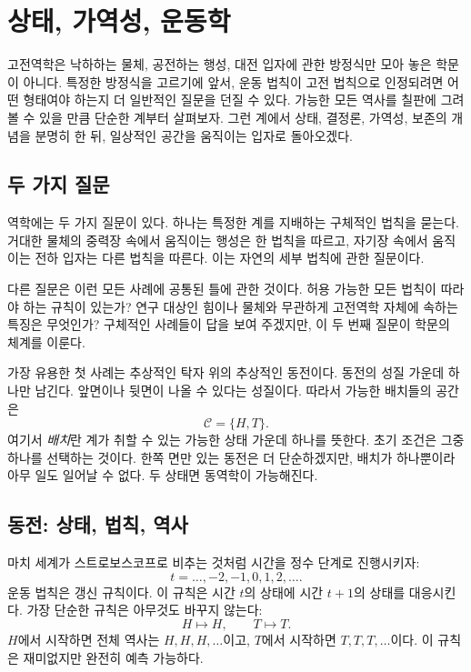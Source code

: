 \chapter{상태, 가역성, 운동학}

고전역학은 낙하하는 물체, 공전하는 행성, 대전 입자에 관한 방정식만 모아 놓은 학문이 아니다. 특정한 방정식을 고르기에 앞서, 운동 법칙이 고전 법칙으로 인정되려면 어떤 형태여야 하는지 더 일반적인 질문을 던질 수 있다. 가능한 모든 역사를 칠판에 그려 볼 수 있을 만큼 단순한 계부터 살펴보자. 그런 계에서 상태, 결정론, 가역성, 보존의 개념을 분명히 한 뒤, 일상적인 공간을 움직이는 입자로 돌아오겠다.

\section{두 가지 질문}

역학에는 두 가지 질문이 있다. 하나는 특정한 계를 지배하는 구체적인 법칙을 묻는다. 거대한 물체의 중력장 속에서 움직이는 행성은 한 법칙을 따르고, 자기장 속에서 움직이는 전하 입자는 다른 법칙을 따른다. 이는 자연의 세부 법칙에 관한 질문이다.

다른 질문은 이런 모든 사례에 공통된 틀에 관한 것이다. 허용 가능한 모든 법칙이 따라야 하는 규칙이 있는가? 연구 대상인 힘이나 물체와 무관하게 고전역학 자체에 속하는 특징은 무엇인가? 구체적인 사례들이 답을 보여 주겠지만, 이 두 번째 질문이 학문의 체계를 이룬다.

가장 유용한 첫 사례는 추상적인 탁자 위의 추상적인 동전이다. 동전의 성질 가운데 하나만 남긴다. 앞면이나 뒷면이 나올 수 있다는 성질이다. 따라서 가능한 배치들의 공간은
\begin{equation}
  \mathcal C=\{H,T\}.
\end{equation}
여기서 \emph{배치}란 계가 취할 수 있는 가능한 상태 가운데 하나를 뜻한다. 초기 조건은 그중 하나를 선택하는 것이다. 한쪽 면만 있는 동전은 더 단순하겠지만, 배치가 하나뿐이라 아무 일도 일어날 수 없다. 두 상태면 동역학이 가능해진다.

\section{동전: 상태, 법칙, 역사}

마치 세계가 스트로보스코프로 비추는 것처럼 시간을 정수 단계로 진행시키자:
\begin{equation}
  t=\ldots,-2,-1,0,1,2,\ldots .
\end{equation}
운동 법칙은 갱신 규칙이다. 이 규칙은 시간 \(t\)의 상태에 시간 \(t+1\)의 상태를 대응시킨다. 가장 단순한 규칙은 아무것도 바꾸지 않는다:
\begin{equation}
  H\longmapsto H,
  \qquad
  T\longmapsto T.
  \label{eq:coin-identity}
\end{equation}
\(H\)에서 시작하면 전체 역사는 \(H,H,H,\ldots\)이고, \(T\)에서 시작하면 \(T,T,T,\ldots\)이다. 이 규칙은 재미없지만 완전히 예측 가능하다.

